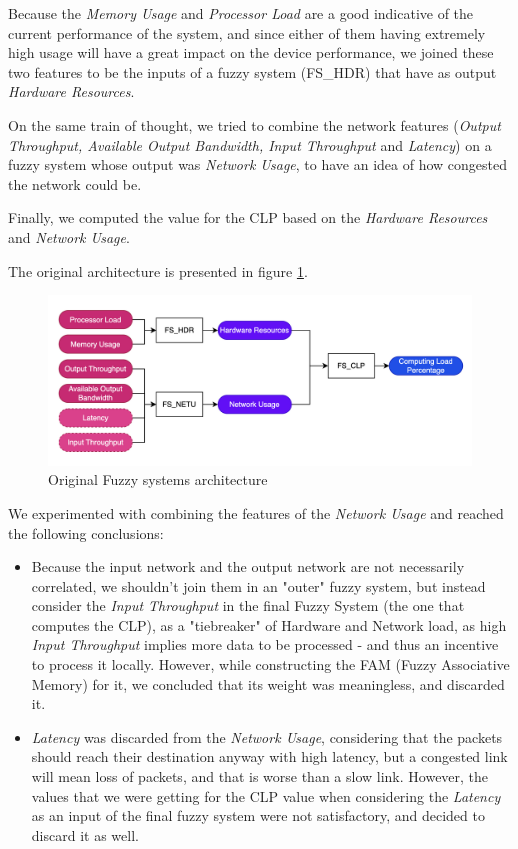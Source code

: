 Because the \textit{Memory Usage} and \textit{Processor Load} are a good indicative of the current performance of the system, and since either of them having extremely high usage will have a great impact on the device performance, we joined these two features to be the inputs of a fuzzy system (FS\_HDR) that have as output \textit{Hardware Resources}.

On the same train of thought, we tried to combine the network features (\textit{Output Throughput, Available Output Bandwidth, Input Throughput} and \textit{Latency}) on a fuzzy system whose output was \textit{Network Usage}, to have an idea of how congested the network could be.

Finally, we computed the value for the CLP based on the \textit{Hardware Resources} and \textit{Network Usage}.

The original architecture is presented in figure \ref{fig:originalFS}.

\begin{figure}[!htb]
    \centering
    \includegraphics[width=\textwidth, height=\textheight, keepaspectratio]{images/fuzzy_systems_og.png}
    \caption{Original Fuzzy systems architecture}
    \label{fig:originalFS}
\end{figure}

We experimented with combining the features of the \textit{Network Usage} and reached the following conclusions:
\begin{itemize}
    \item Because the input network and the output network are not necessarily correlated, we shouldn't join them in an "outer" fuzzy system, but instead consider the \textit{Input Throughput} in the final Fuzzy System (the one that computes the CLP), as a "tiebreaker" of Hardware and Network load, as high \textit{Input Throughput} implies more data to be processed - and thus an incentive to process it locally. However, while constructing the FAM (Fuzzy Associative Memory) for it, we concluded that its weight was meaningless, and discarded it.
    \item \textit{Latency} was discarded from the \textit{Network Usage}, considering that the packets should reach their destination anyway with high latency, but a congested link will mean loss of packets, and that is worse than a slow link. However, the values that we were getting for the CLP value when considering the \textit{Latency} as an input of the final fuzzy system were not satisfactory, and decided to discard it as well.
\end{itemize}

